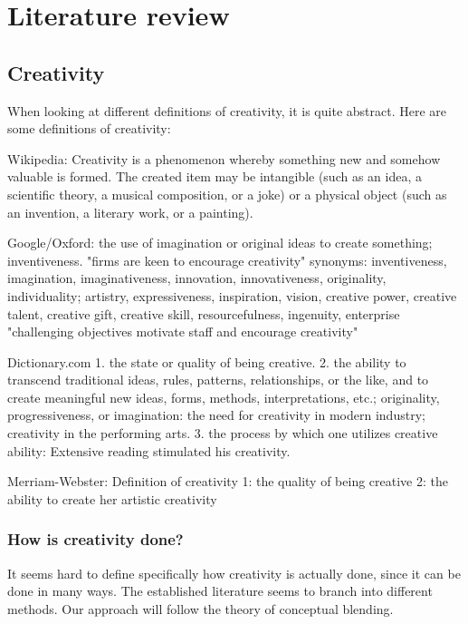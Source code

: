 
\chapter{Literature review} %

\label{Chapter3} %


\section{Creativity}
When looking at different definitions of creativity, it is quite abstract. Here are some definitions of creativity:

Wikipedia:
Creativity is a phenomenon whereby something new and somehow valuable is formed. The created item may be intangible (such as an idea, a scientific theory, a musical composition, or a joke) or a physical object (such as an invention, a literary work, or a painting).

Google/Oxford:
the use of imagination or original ideas to create something; inventiveness.
"firms are keen to encourage creativity"
synonyms:
inventiveness, imagination, imaginativeness, innovation, innovativeness, originality, individuality; 
artistry, expressiveness, inspiration, vision, creative power, creative talent, creative gift, creative skill, resourcefulness, ingenuity, enterprise
"challenging objectives motivate staff and encourage creativity"

Dictionary.com
1.
the state or quality of being creative.
2.
the ability to transcend traditional ideas, rules, patterns, relationships, or the like, and to create meaningful new ideas, forms, methods, interpretations, etc.; originality, progressiveness, or imagination:
the need for creativity in modern industry; creativity in the performing arts.
3.
the process by which one utilizes creative ability:
Extensive reading stimulated his creativity.

Merriam-Webster:
Definition of creativity
1:  the quality of being creative
2:  the ability to create her artistic creativity

\subsection{How is creativity done?}
It seems hard to define specifically how creativity is actually done, since it can be done in many ways. The established literature seems to branch into different methods. Our approach will follow the theory of conceptual blending.

